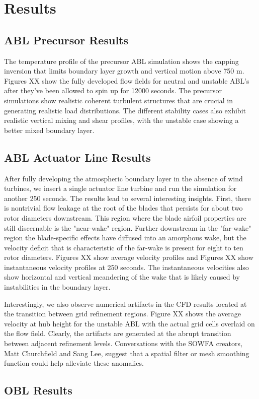 \section{Results}

\subsection{ABL Precursor Results}
The temperature profile of the precursor ABL simulation shows the capping inversion that limits boundary layer growth and vertical motion above 750 m.  Figures XX show the fully developed flow fields for neutral and unstable ABL's after they've been allowed to spin up for 12000 seconds.  The precursor simulations show realistic coherent turbulent structures that are crucial in generating realistic load distributions.  The different stability cases also exhibit realistic vertical mixing and shear profiles, with the unstable case showing a better mixed boundary layer.

\subsection{ABL Actuator Line Results}
After fully developing the atmospheric boundary layer in the absence of wind turbines, we insert a single actuator line turbine and run the simulation for another 250 seconds.  The results lead to several interesting insights.  First, there is nontrivial flow leakage at the root of the blades that persists for about two rotor diameters downstream.  This region where the blade airfoil properties are still discernable is the "near-wake" region\cite{sanderse_review_2011}.  Further downstream in the "far-wake" region the blade-specific effects have diffused into an amorphous wake, but the velocity deficit that is characteristic of the far-wake is present for eight to ten rotor diameters.  Figures XX show average velocity profiles and Figures XX show instantaneous velocity profiles at 250 seconds.  The instantaneous velocities also show horizontal and vertical meandering of the wake that is likely caused by instabilities in the boundary layer.

Interestingly, we also observe numerical artifacts in the CFD results located at the transition between grid refinement regions.  Figure XX shows the average velocity at hub height for the unstable ABL with the actual grid cells overlaid on the flow field.  Clearly, the artifacts are generated at the abrupt transition between adjacent refinement levels.  Conversations with the SOWFA creators, Matt Churchfield and Sang Lee, suggest that a spatial filter or mesh smoothing function could help alleviate these anomalies.



\subsection{OBL Results}

